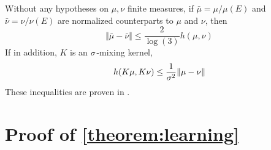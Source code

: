 \begin{proposition}\label{prop:comparaison}
Without any hypotheses on $\mu, \nu$ finite measures, if $\bar \mu = \mu / \mu(E)$ and $\bar \nu = \nu / \nu(E)$ are normalized counterparts to $\mu$ and $\nu$, then
    \begin{equation}\label{eq:tv-to-hilbert}
        \Vert \bar\mu - \bar\nu \Vert \leq \frac{2}{\log(3)}h(\mu, \nu)
    \end{equation}
If in addition, $K$ is an $\sigma$-mixing kernel,
\begin{equation}\label{eq:hilbert-to-tv}
    h(K\mu, K\nu) \leq \frac{1}{\sigma^2} \Vert \mu - \nu \Vert
\end{equation}
These inequalities are proven in \cite{cohen}.
\end{proposition}
\section{Proof of \cref{theorem:learning}}\label{sec:proof-learning}







